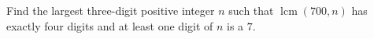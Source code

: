 Find the largest three-digit positive integer $n$ such that $\operatorname{lcm}(700,n)$ has exactly four digits and at least one digit of $n$ is a $7$.
